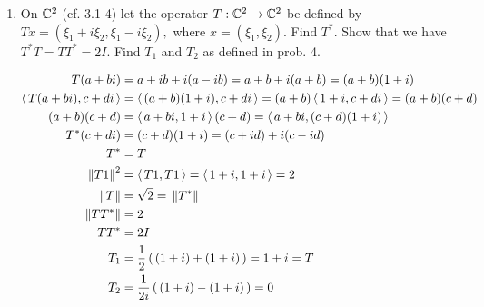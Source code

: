 \documentclass[10pt,a4paper]{report}
\newcommand{\NORM}[1]{\,\left \Vert #1 \right \Vert}
\begin{document}
\begin{enumerate}
	\item On $\mathbb{C}^2$ (cf. 3.1-4) let the operator $T: \mathbb{C}^2\to \mathbb{C}^2$ be defined by $Tx=(\xi_1+i\xi_2, \xi_1-i\xi_2),$ where $x=(\xi_1,\xi_2)$.  Find $T^*$.  Show that we have $T^*T=TT^*=2I$.  Find $T_1$ and $T_2$ as defined in prob. 4.

	\begin{align*}
		T(a+bi) &= a+ib+i(a-ib) = a+b+i(a+b) = (a+b)(1+i) \\
		\ABRACKET{T(a+bi), c+di} &= \ABRACKET{(a+b)(1+i), c+di}= (a+b)\ABRACKET{1+i,c+di} = (a+b)(c+d)\\
		(a+b)(c+d) &= \ABRACKET{a+bi, 1+i}(c+d) = \ABRACKET{a+bi, (c+d)(1+i)} \\
		T^*(c+di) &= (c+d)(1+i) = (c+id)+i(c-id) \\
		T^* &= T \\
		\NORM{T1}^2 &= \ABRACKET{T1, T1} = \ABRACKET{1+i, 1+i} = 2 \\
		\NORM{T} &= \sqrt{2} = \NORM{T^*} \\
		\NORM{TT^*} &= 2 \\
		TT^* &= 2I \\
		T_1 &= \frac{1}{2}\PAREN{(1+i)+(1+i)} = 1+i = T \\
		T_2 &= \frac{1}{2i}\PAREN{(1+i)-(1+i)} = 0 \\
	\end{align*}
\end{enumerate}
\end{document}
